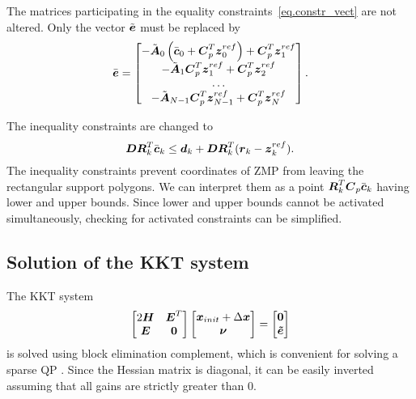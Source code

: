 The matrices participating in the equality constraints~\eqref{eq.constr_vect} are 
not altered. Only the vector $\tilde{\mbox{\boldmath $e$}}$ must be replaced by
$$
\bar{\mbox{\boldmath $e$}} = 
    \begin{bmatrix}
        -\tilde{\mbox{\boldmath $A$}}_0 \left(\bar{\mbox{\boldmath $c$}}_0  + \mbox{\boldmath $C$}_p^T \mbox{\boldmath $z$}^{ref}_0\right) + \mbox{\boldmath $C$}_p^T \mbox{\boldmath $z$}^{ref}_1 \\
        -\tilde{\mbox{\boldmath $A$}}_1 \mbox{\boldmath $C$}_p^T \mbox{\boldmath $z$}^{ref}_1 + \mbox{\boldmath $C$}_p^T \mbox{\boldmath $z$}^{ref}_{2} \\
        \dots \\
        -\tilde{\mbox{\boldmath $A$}}_{N-1} \mbox{\boldmath $C$}_p^T \mbox{\boldmath $z$}^{ref}_{N-1} + \mbox{\boldmath $C$}_p^T \mbox{\boldmath $z$}^{ref}_{N} \\
    \end{bmatrix}.
$$

The inequality constraints are changed to 
$$
\mbox{\boldmath $D$}\mbox{\boldmath $R$}^T_k\bar{\mbox{\boldmath $c$}}_k \leq \mbox{\boldmath $d$}_{k} + \mbox{\boldmath $D$}\mbox{\boldmath $R$}^T_k(\mbox{\boldmath $r$}_k - \mbox{\boldmath $z$}^{ref}_k).
$$
The inequality constraints prevent coordinates of \ac{ZMP} from leaving the rectangular 
support polygons. We can interpret them as a point $\mbox{\boldmath $R$}^T_k \mbox{\boldmath $C$}_p \bar{\mbox{\boldmath $c$}}_k$ 
having lower and upper bounds. Since lower and upper bounds cannot be activated
simultaneously, checking for activated constraints can be simplified.



\subsection{Solution of the KKT system}
The \ac{KKT} system 
\begin{equation}\label{eq.kkt}
    \begin{bmatrix} 
        2\mbm{H} & \mbm{E}^T \\ 
        \mbm{E} & \mbm{0} 
    \end{bmatrix}
    \begin{bmatrix} 
        \mbm{x}_{init} + \Delta\mbm{x}\\ 
        \mbm{\nu}
    \end{bmatrix}
   =
    \begin{bmatrix} 
        \mbm{0} \\ 
        \mbm{\tilde{e}} 
    \end{bmatrix}
\end{equation}
is solved using block elimination complement, which is convenient for solving a sparse \ac{QP} 
\cite{GillSchurQP}. Since the Hessian matrix is diagonal, it can be easily inverted 
assuming that all gains are strictly greater than 0.

